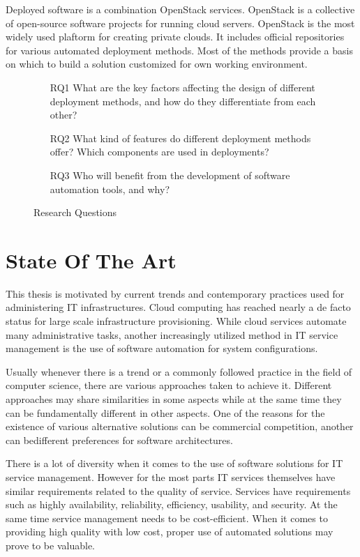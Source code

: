 Deployed software is a combination OpenStack services. OpenStack is a
collective of open-source software projects for running cloud servers.
OpenStack is the most widely used plaftorm for creating private clouds. It
includes official repositories for various automated deployment methods. Most
of the methods provide a basis on which to build a solution customized for own
working environment.

\begin{figure}[t]
\centering
\begin{itemize}
  \item [RQ1] What are the key factors affecting the design of different
              deployment methods, and how do they differentiate from each
              other?
  \item [RQ2] What kind of features do different deployment methods offer?
              Which components are used in deployments?
  \item [RQ3] Who will benefit from the development of software automation
              tools, and why?
\end{itemize}
\caption{Research Questions}
\label{fig:rqs}
\end{figure}

\chapter{State Of The Art}

This thesis is motivated by current trends and contemporary practices used for
administering IT infrastructures. Cloud computing has reached nearly a de facto
status for large scale infrastructure provisioning. While cloud services
automate many administrative tasks, another increasingly utilized method in IT
service management is the use of software automation for system configurations.

Usually whenever there is a trend or a commonly followed practice in the field
of computer science, there are various approaches taken to achieve it.
Different approaches may share similarities in some aspects while at the same
time they can be fundamentally different in other aspects. One of the reasons
for the existence of various alternative solutions can be commercial
competition, another can bedifferent preferences for software architectures.

There is a lot of diversity when it comes to the use of software solutions for
IT service management. However for the most parts IT services themselves have
similar requirements related to the quality of service. Services have
requirements such as highly availability, reliability, efficiency, usability,
and security. At the same time service management needs to be cost-efficient.
When it comes to providing high quality with low cost, proper use of automated
solutions may prove to be valuable.

